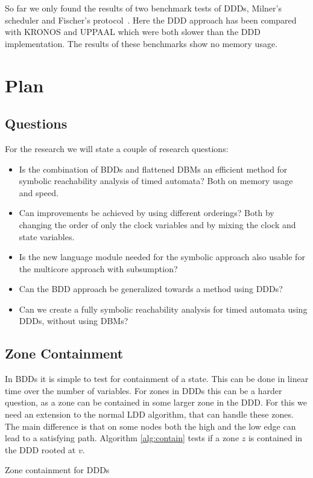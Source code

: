 \documentclass[11pt]{article}
\begin{document}
So far we only found the results of two benchmark tests of DDDs, Milner's scheduler and Fischer's protocol~\cite{Møller200253}. Here the DDD approach has been compared with KRONOS and UPPAAL which were both slower than the DDD implementation. The results of these benchmarks show no memory usage.  

\section{Plan}

\subsection{Questions}
For the research we will state a couple of research questions:
{\renewcommand\labelitemi{--}
	\begin{itemize}
		\item Is the combination of BDDs and flattened DBMs an efficient method for symbolic reachability analysis of timed automata? Both on memory usage and speed.
		\item Can improvements be achieved by using different orderings? Both by changing the order of only the clock variables and by mixing the clock and state variables.
		\item Is the new language module needed for the symbolic approach also usable for the multicore approach with subsumption?
		\item Can the BDD approach be generalized towards a method using DDDs?
		\item Can we create a fully symbolic reachability analysis for timed automata using DDDs, without using DBMs?
	\end{itemize}
}

\subsection{Zone Containment}
In BDDs it is simple to test for containment of a state. This can be done in linear time over the number of variables. For zones in DDDs this can be a harder question, as a zone can be contained in some larger zone in the DDD. For this we need an extension to the normal LDD algorithm, that can handle these zones. The main difference is that on some nodes both the high and the low edge can lead to a satisfying path. Algorithm \ref{alg:contain} tests if a zone $z$ is contained in the DDD rooted at $v$.

\begin{algorithm}
\caption{Zone containment for DDDs}\label{alg:contain}
\begin{algorithmic}[1]
	\EndIf
			\Return{\True}
		\EndIf
	\EndIf
\EndProcedure
\end{algorithmic}
\end{algorithm}
\end{document}
